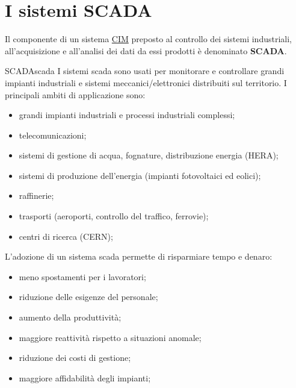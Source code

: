 \section{I sistemi SCADA}\label{sec:scada} %
Il componente di un sistema \hyperref[sub:smart_manufacturing]{CIM} preposto al controllo dei sistemi industriali, all'acquisizione e all'analisi dei dati da essi prodotti è denominato \textbf{SCADA}.
\begin{definition}{SCADA}{scada}
    I sistemi \ac{scada} sono usati per monitorare e controllare grandi impianti industriali e sistemi meccanici/elettronici distribuiti sul territorio.
    I principali ambiti di applicazione sono:
    \begin{itemize}
        \item grandi impianti industriali e processi industriali complessi;
        \item telecomunicazioni;
        \item sistemi di gestione di acqua, fognature, distribuzione energia (HERA);
        \item sistemi di produzione dell'energia (impianti fotovoltaici ed eolici);
        \item raffinerie;
        \item trasporti (aeroporti, controllo del traffico, ferrovie);
        \item centri di ricerca (CERN);
    \end{itemize}
    L'adozione di un sistema \ac{scada} permette di risparmiare tempo e denaro:
    \begin{itemize}
        \item meno spostamenti per i lavoratori;
        \item riduzione delle esigenze del personale;
        \item aumento della produttività;
        \item maggiore reattività rispetto a situazioni anomale;
        \item riduzione dei costi di gestione;
        \item maggiore affidabilità degli impianti;
    \end{itemize}
\end{definition}
